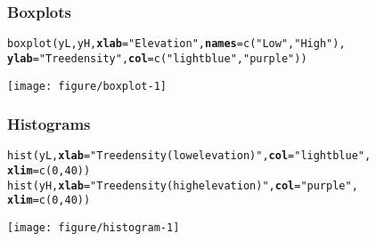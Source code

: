 \documentclass[color=usenames,dvipsnames]{beamer}\usepackage[]{graphicx}\usepackage[]{color}
\makeatletter
\newcommand{\hlnum}[1]{\textcolor[rgb]{0.69,0.494,0}{#1}}%
\newcommand{\hlstr}[1]{\textcolor[rgb]{0.749,0.012,0.012}{#1}}%
\newcommand{\hlstd}[1]{\textcolor[rgb]{0,0,0}{#1}}%
\newcommand{\hlkwc}[1]{\textcolor[rgb]{0,0,0}{\textbf{#1}}}%
\newcommand{\hlkwd}[1]{\textcolor[rgb]{0.004,0.004,0.506}{#1}}%
\newenvironment{kframe}{%
 \def\at@end@of@kframe{}%
 \ifinner\ifhmode%
  \def\at@end@of@kframe{\end{minipage}}%
  \begin{minipage}{\columnwidth}%
 \fi\fi%
 \def\FrameCommand##1{\hskip\@totalleftmargin \hskip-\fboxsep
 \colorbox{shadecolor}{##1}\hskip-\fboxsep
     \hskip-\linewidth \hskip-\@totalleftmargin \hskip\columnwidth}%
 \MakeFramed {\advance\hsize-\width
   \@totalleftmargin\z@ \linewidth\hsize
   \@setminipage}}%
 {\par\unskip\endMakeFramed%
 \at@end@of@kframe}
\newenvironment{knitrout}{}{} %
\makeatother
\begin{document}
\begin{frame}[fragile]
  \frametitle{Boxplots}
  \footnotesize
\begin{knitrout}
\color{fgcolor}\begin{kframe}
\begin{alltt}
\hlkwd{boxplot}\hlstd{(yL, yH,} \hlkwc{xlab}\hlstd{=}\hlstr{"Elevation"}\hlstd{,} \hlkwc{names}\hlstd{=}\hlkwd{c}\hlstd{(}\hlstr{"Low"}\hlstd{,} \hlstr{"High"}\hlstd{),}
        \hlkwc{ylab}\hlstd{=}\hlstr{"Tree density"}\hlstd{,} \hlkwc{col}\hlstd{=}\hlkwd{c}\hlstd{(}\hlstr{"lightblue"}\hlstd{,} \hlstr{"purple"}\hlstd{))}
\end{alltt}
\end{kframe}
\end{knitrout}
\vspace{-3mm}
  \begin{center}
    \texttt{[image: figure/boxplot-1]}
  \end{center}
\end{frame}





\begin{frame}[fragile]
  \frametitle{Histograms}
  \footnotesize

\begin{knitrout}
\color{fgcolor}\begin{kframe}
\begin{alltt}
\hlkwd{hist}\hlstd{(yL,} \hlkwc{xlab}\hlstd{=}\hlstr{"Tree density (low elevation)"}\hlstd{,} \hlkwc{col}\hlstd{=}\hlstr{"lightblue"}\hlstd{,}
     \hlkwc{xlim}\hlstd{=}\hlkwd{c}\hlstd{(}\hlnum{0}\hlstd{,} \hlnum{40}\hlstd{))}
\hlkwd{hist}\hlstd{(yH,} \hlkwc{xlab}\hlstd{=}\hlstr{"Tree density (high elevation)"}\hlstd{,} \hlkwc{col}\hlstd{=}\hlstr{"purple"}\hlstd{,}
     \hlkwc{xlim}\hlstd{=}\hlkwd{c}\hlstd{(}\hlnum{0}\hlstd{,} \hlnum{40}\hlstd{))}
\end{alltt}
\end{kframe}
\end{knitrout}
\texttt{[image: figure/histogram-1]}
\end{frame}





\end{document}
